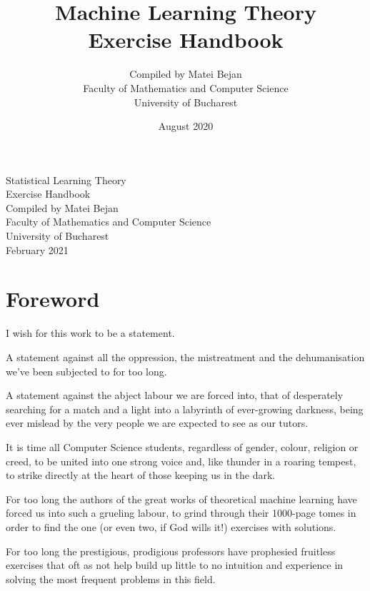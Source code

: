 \documentclass{article}
\title{Machine Learning Theory \\ Exercise Handbook}
\author{Compiled by Matei Bejan \\ Faculty of Mathematics and Computer Science \\ University of Bucharest}
\date{August 2020}
\newcommand{\<}{\langle}
\renewcommand{\>}{\rangle}
\theoremstyle{definition}
\begin{document}

\vspace*{\fill}
    \begin{center}
        \Huge{Statistical Learning Theory \\ Exercise Handbook}\\
        \vspace{1mm}
        \Large{Compiled by Matei Bejan \\ Faculty of Mathematics and Computer Science \\ University of Bucharest}\\
        \vspace{1mm}
        \large{February 2021}
    \end{center}
    \vspace*{\fill}

\newpage

\section*{Foreword}

\hspace{0.42cm} I wish for this work to be a statement. 

A statement against all the oppression, the mistreatment and the dehumanisation we've been subjected to for too long.

A statement against the abject labour we are forced into, that of desperately searching for a match and a light into a labyrinth of ever-growing darkness, being ever mislead by the very people we are expected to see as our tutors.

\vspace{1mm}

It is time all Computer Science students, regardless of gender, colour, religion or creed, to be united into one strong voice and, like thunder in a roaring tempest, to strike directly at the heart of those keeping us in the dark. 

For too long the authors of the great works of theoretical machine learning have forced us into such a grueling labour, to grind through their 1000-page tomes in order to find the one (or even two, if God  wills it!) exercises with solutions.

For too long the prestigious, prodigious professors have prophesied fruitless exercises that oft as not help build up little to no intuition and experience in solving the most frequent problems in this field.
\end{document}
